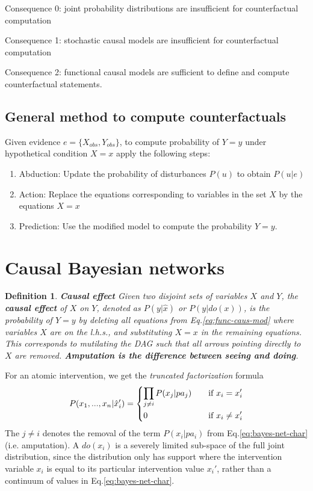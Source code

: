 \documentclass[11pt]{article}
\numberwithin{equation}{section}
\newtheorem{defn}{Definition}[section]
\begin{document}
Consequence 0: joint probability distributions are insufficient for counterfactual computation

Consequence 1: stochastic causal models are insufficient for counterfactual computation

Consequence 2: functional causal models are sufficient to define and compute counterfactual statements.

\subsection{General method to compute counterfactuals}
Given evidence $e=\{X_{obs}, Y_{obs}\}$, to compute probability of $Y=y$ under hypothetical condition $X=x$ apply the following steps:
\begin{enumerate}[noitemsep]
\item Abduction: Update the probability of disturbances $P(u)$ to obtain $P(u|e)$
\item Action: Replace the equations corresponding to variables in the set $X$ by the equations $X=x$
\item Prediction: Use the modified model to compute the probability $Y=y$.
\end{enumerate}

\section{Causal Bayesian networks}
\begin{defn}
\textbf{Causal effect} Given two disjoint sets of variables $X$ and $Y$, the \textbf{causal effect} of $X$ on $Y$, denoted as $P(y|\hat{x})$ or $P(y|do(x))$, is the probability of $Y=y$ by deleting all equations from Eq.\eqref{eq:func-caus-mod} where variables $X$ are on the l.h.s., and substituting $X=x$ in the remaining equations. This corresponds to mutilating the DAG such that all arrows pointing directly to $X$ are removed. \textbf{Amputation is the difference between seeing and doing}.
\end{defn}

For an atomic intervention, we get the \textit{truncated factorization} formula
\begin{equation}
P(x_1,...,x_n|\hat{x}'_i)=\begin{dcases}
\prod_{j\neq i} P(x_j|pa_j) \quad &\text{if}\ x_i = x_i'\\
0 &\text{if}\ x_i \neq x_i'
\end{dcases}
\end{equation}
The $j\neq i$ denotes the removal of the term $P(x_i|pa_i)$ from Eq.\eqref{eq:bayes-net-char} (i.e. amputation). A $do(x_i)$ is a severely limited sub-space of the full joint distribution, since the distribution only has support where the intervention variable $x_i$ is equal to its particular intervention value $x_i'$, rather than a continuum of values in Eq.\eqref{eq:bayes-net-char}.
\end{document}
